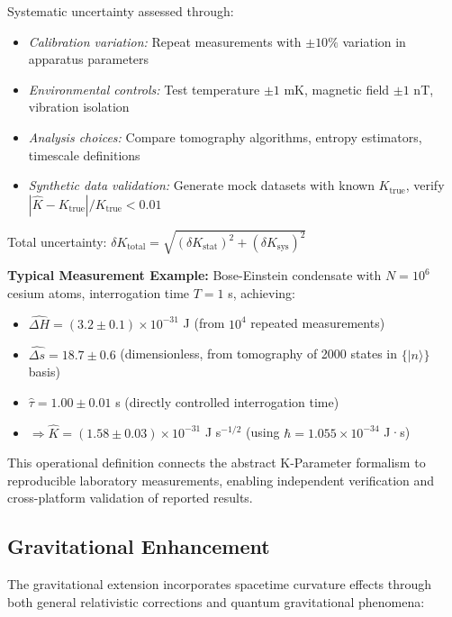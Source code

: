 \documentclass[11pt,a4paper,twoside]{article}
\begin{document}
\begin{tcolorbox}[colback=blue!5!white,colframe=blue!75!black,title=\textbf{K-Parameter Estimator Pipeline}]
Systematic uncertainty assessed through:
\begin{itemize}[leftmargin=*]
    \item \textit{Calibration variation:} Repeat measurements with $\pm 10\%$ variation in apparatus parameters
    \item \textit{Environmental controls:} Test temperature $\pm 1$ mK, magnetic field $\pm 1$ nT, vibration isolation
    \item \textit{Analysis choices:} Compare tomography algorithms, entropy estimators, timescale definitions
    \item \textit{Synthetic data validation:} Generate mock datasets with known $K_{\text{true}}$, verify $|\hat{K} - K_{\text{true}}|/K_{\text{true}} < 0.01$
\end{itemize}

Total uncertainty: $\delta K_{\text{total}} = \sqrt{(\delta K_{\text{stat}})^2 + (\delta K_{\text{sys}})^2}$

\end{tcolorbox}

\textbf{Typical Measurement Example:} Bose-Einstein condensate with $N = 10^6$ cesium atoms, interrogation time $T = 1$ s, achieving:
\begin{itemize}[leftmargin=*]
    \item $\widehat{\Delta H} = (3.2 \pm 0.1) \times 10^{-31}$ J (from $10^4$ repeated measurements)
    \item $\widehat{\Delta s} = 18.7 \pm 0.6$ (dimensionless, from tomography of 2000 states in $\{|n\rangle\}$ basis)
    \item $\hat{\tau} = 1.00 \pm 0.01$ s (directly controlled interrogation time)
    \item $\Rightarrow \hat{K} = (1.58 \pm 0.03) \times 10^{-31}$ J s$^{-1/2}$ (using $\hbar = 1.055 \times 10^{-34}$ J·s)
\end{itemize}

This operational definition connects the abstract K-Parameter formalism to reproducible laboratory measurements, enabling independent verification and cross-platform validation of reported results.

\subsection{Gravitational Enhancement}

The gravitational extension incorporates spacetime curvature effects through both general relativistic corrections and quantum gravitational phenomena:
\end{document}
